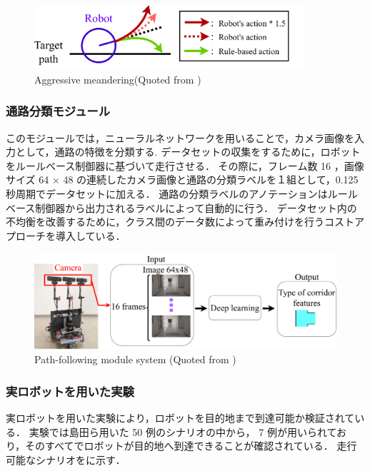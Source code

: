 \begin{figure}[htbp]
  \centering
  \includegraphics[width=100mm]{images/pdf/fujiwara/behavior.pdf}
  \caption[Aggressive meandering]{Aggressive meandering(Quoted from \cite{fujiwara2023})}
  \label{fig:behavior}
\end{figure}

\subsubsection{通路分類モジュール}
このモジュールでは，ニューラルネットワークを用いることで，カメラ画像を入力として，通路の特徴を分類する.
データセットの収集をするために，ロボットをルールベース制御器に基づいて走行させる．
その際に，フレーム数 16 ，画像サイズ 64 × 48 の連続したカメラ画像と通路の分類ラベルを１組として，0.125 秒周期でデータセットに加える．
通路の分類ラベルのアノテーションはルールベース制御器から出力されるラベルによって自動的に行う．
データセット内の不均衡を改善するために，クラス間のデータ数によって重み付けを行うコストアプローチを導入している．

\begin{figure}[htbp]
  \centering
   \includegraphics[width=130mm]{images/pdf/haruyama/intersection_sys.pdf}
   \caption[Path-following module system]{Path-following module system (Quoted from \cite{haruyama2023})}
   \label{fig:intersection}
\end{figure}

\subsubsection{実ロボットを用いた実験}
実ロボットを用いた実験により，ロボットを目的地まで到達可能か検証されている．
実験では島田ら用いた 50 例のシナリオの中から， 7 例が用いられており，そのすべてでロボットが目的地へ到達できることが確認されている．
走行可能なシナリオをに示す．

